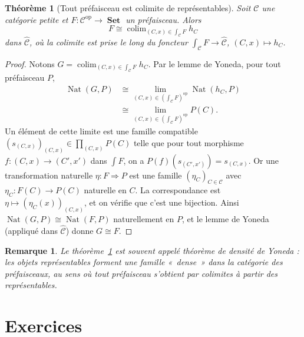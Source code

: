 \documentclass[a4paper,12pt]{book}
\DeclareMathOperator{\Nat}{Nat}
\DeclareMathOperator{\colim}{colim}
\DeclareMathOperator{\Set}{\mathbf{Set}}
\newcommand{\op}{\mathrm{op}}
\newtheorem{theoreme}{Théorème}[chapter]
\newtheorem*{remarque}{Remarque}
\begin{document}
\begin{theoreme}[Tout préfaisceau est colimite de représentables]%
\label{thm:prefaisceau-colimite-representables}
Soit $\mathcal{C}$ une catégorie petite et
$F \colon \mathcal{C}^{\op} \to \Set$ un préfaisceau. Alors
\[
    F \cong \colim_{(C, x) \in \int_{\mathcal{C}} F} h_C
\]
dans $\widehat{\mathcal{C}}$, où la colimite est prise le long du
foncteur $\int_{\mathcal{C}} F \to \widehat{\mathcal{C}}$,
$(C, x) \mapsto h_C$.
\end{theoreme}

\begin{proof}
Notons $G = \colim_{(C,x) \in \int_{\mathcal{C}} F} h_C$.
Par le lemme de Yoneda, pour tout préfaisceau $P$,
\begin{align*}
    \Nat(G, P)
    &\cong \lim_{(C,x) \in (\int_{\mathcal{C}} F)^{\op}} \Nat(h_C, P) \\
    &\cong \lim_{(C,x) \in (\int_{\mathcal{C}} F)^{\op}} P(C).
\end{align*}
Un élément de cette limite est une famille compatible
$(s_{(C,x)})_{(C,x)} \in \prod_{(C,x)} P(C)$ telle que
pour tout morphisme $f \colon (C,x) \to (C', x')$ dans $\int F$,
on a $P(f)(s_{(C',x')}) = s_{(C,x)}$.
Or une transformation naturelle $\eta \colon F \Rightarrow P$ est
une famille $(\eta_C)_{C \in \mathcal{C}}$ avec
$\eta_C \colon F(C) \to P(C)$ naturelle en $C$.
La correspondance est $\eta \mapsto (\eta_C(x))_{(C,x)}$,
et on vérifie que c'est une bijection. Ainsi
$\Nat(G, P) \cong \Nat(F, P)$ naturellement en $P$,
et le lemme de Yoneda (appliqué dans $\widehat{\mathcal{C}}$)
donne $G \cong F$.
\end{proof}

\begin{remarque}\label{rem:colimite-representables-densite}
Le théorème~\ref{thm:prefaisceau-colimite-representables} est souvent
appelé \emph{théorème de densité} de Yoneda : les objets représentables
forment une famille «~dense~» dans la catégorie des préfaisceaux, au sens
où tout préfaisceau s'obtient par colimites à partir des représentables.
\end{remarque}


\section{Exercices}\label{sec:exo-yoneda}
\end{document}
